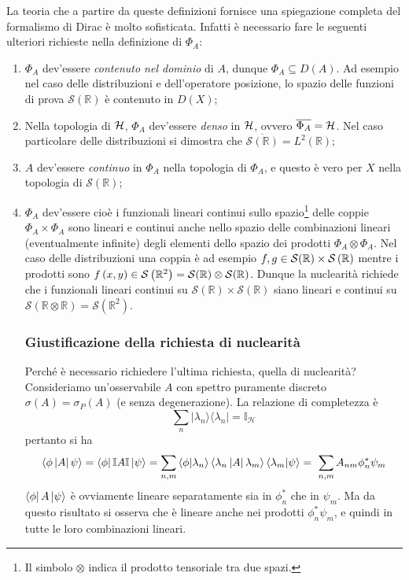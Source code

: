 \documentclass[../../FisicaTeorica.tex]{subfiles}
\begin{document}
La teoria che a partire da queste definizioni fornisce una spiegazione completa del formalismo di Dirac è molto sofisticata. Infatti è necessario fare le seguenti ulteriori richieste nella definizione di $\Phi_A$:
\begin{enumerate}
    \item $\Phi_A$ dev'essere \emph{contenuto nel dominio} di $A$, dunque $\displaystyle \Phi_A\subseteq D\left(A\right)$. Ad esempio nel caso delle distribuzioni e dell'operatore posizione, lo spazio delle funzioni di prova $\mathcal S\left(\mathbb{R}\right)$ è contenuto in $D(X)$;
	\item Nella topologia di $\mathcal{H}$, $\Phi_A$ dev'essere \emph{denso} in $\mathcal{H}$, ovvero $\overline{\Phi_A} = \mathcal{H}$. Nel caso particolare delle distribuzioni si dimostra che $\overline{\mathcal{S}\left(\mathbb{R}\right)} = L^2(\mathbb R)$;
	\item $A$ dev'essere \emph{continuo} in $\Phi_A$ nella topologia di $\Phi_A$, e questo è vero per $X$ nella topologia di $\mathcal S\left(\mathbb{R}\right)$;
	\item $\Phi_A$ dev'essere  cioè i funzionali lineari continui sullo spazio\footnote{Il simbolo $\otimes$ indica il prodotto tensoriale tra due spazi.} delle coppie $\Phi_A\times \Phi_A$ sono lineari e continui anche nello spazio delle combinazioni lineari (eventualmente infinite) degli elementi dello spazio dei prodotti $\Phi_A \otimes \Phi_A$. Nel caso delle distribuzioni una coppia è ad esempio $f,g\in \mathcal{S}(\mathbb{R})\times \mathcal{S}\left(\mathbb{R}\right)$ mentre i prodotti sono $f\left(x,y\right)\in \mathcal S\left(\mathbb{R}^2\right) = \mathcal{S}(\mathbb{R})\otimes \mathcal{S}(\mathbb{R})$. Dunque la nuclearità richiede che i funzionali lineari continui su $\mathcal{S}\left(\mathbb{R}\right)\times \mathcal{S}\left(\mathbb{R}\right)$ siano lineari e continui su $\mathcal S(\mathbb R \otimes \mathbb R) = \mathcal{S}(\mathbb{R}^2)$.
	
	\subsubsection{Giustificazione della richiesta di nuclearità}
	Perché è necessario richiedere l'ultima richiesta, quella di nuclearità? 
	Consideriamo un'osservabile $A$ con spettro puramente discreto $\sigma \left(A\right)=\sigma_P(A)$ (e senza degenerazione). La relazione di completezza è
	\[
	\sum_{n}{|\lambda_n\rangle \langle\lambda_n|}=\mathbb{I}_\mathcal{H}
	\]
	pertanto si ha
	\[
	\left\langle\phi\left|A\right|\psi\right\rangle = \Bra\phi\mathbb{I}A\mathbb{I}\Ket\psi
	= \sum_{n,m}{\left\langle\phi\middle|\lambda_n\right\rangle\left\langle\lambda_n\left|A\right|\lambda_m\right\rangle\left\langle\lambda_m\middle|\psi\right\rangle}
	= \ \sum_{n,m}{A_{nm}\phi_n^\ast\psi_{m}}
	\]
	$\Bra\phi A \Ket\psi$ è ovviamente lineare separatamente sia in $\phi_n^\ast$ che in $\psi_m$. Ma da questo risultato si osserva che è lineare anche nei prodotti $\phi_n^\ast\psi_m$, e quindi in tutte le loro combinazioni lineari.
	

\end{enumerate}
\end{document}
